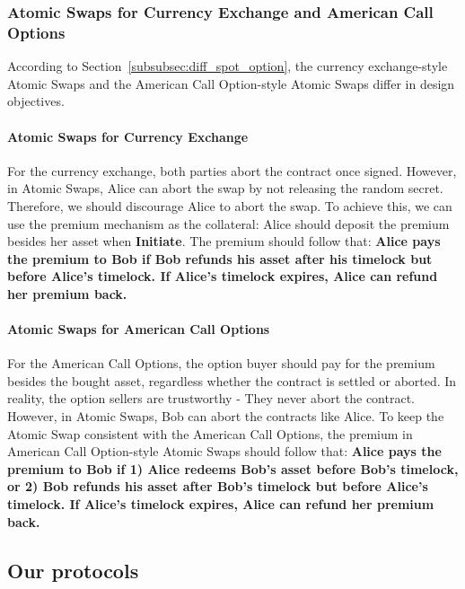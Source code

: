 \subsubsection{Atomic Swaps for Currency Exchange and American Call Options}
\label{subsubsec:design_obj}

According to Section~\ref{subsubsec:diff_spot_option}, the currency exchange-style Atomic Swaps and the American Call Option-style Atomic Swaps differ in design objectives.

\paragraph{Atomic Swaps for Currency Exchange}
For the currency exchange, both parties  abort the contract once signed.
However, in Atomic Swaps, Alice can abort the swap by not releasing the random secret.
Therefore, we should discourage Alice to abort the swap.
To achieve this, we can use the premium mechanism as the collateral: Alice should deposit the premium besides her asset when \textbf{Initiate}.
The premium should follow that:
\textbf{Alice pays the premium to Bob if Bob refunds his asset after his timelock but before Alice's timelock.
If Alice's timelock expires, Alice can refund her premium back.}

\paragraph{Atomic Swaps for American Call Options}
For the American Call Options, the option buyer should pay for the premium besides the bought asset, regardless whether the contract is settled or aborted.
In reality, the option sellers are trustworthy - They never abort the contract.
However, in Atomic Swaps, Bob can abort the contracts like Alice.
To keep the Atomic Swap consistent with the American Call Options,
the premium in American Call Option-style Atomic Swaps should follow that: 
\textbf{Alice pays the premium to Bob if
1) Alice redeems Bob's asset before Bob's timelock, or
2) Bob refunds his asset after Bob's timelock but before Alice's timelock.
If Alice's timelock expires, Alice can refund her premium back.}











\subsection{Our protocols}


